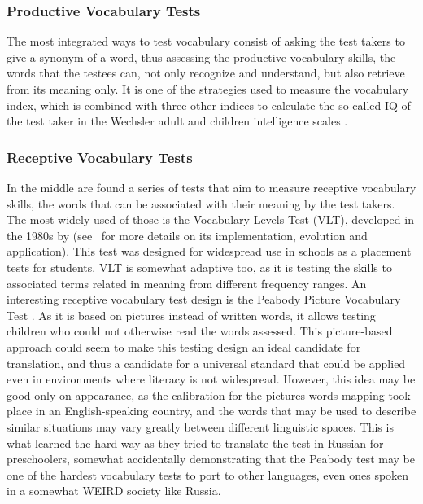         \subsubsection{Productive Vocabulary Tests}
The most integrated ways to test vocabulary consist of asking the test takers to give a synonym of a word, thus assessing the productive vocabulary skills, the words that the testees can, not only recognize and understand, but also retrieve from its meaning only. It is one of the strategies used to measure the vocabulary index, which is combined with three other indices to calculate the so-called IQ of the test taker in the Wechsler adult and children intelligence scales \parencite{wechsler_wechsler_nodate}.

        \subsubsection{Receptive Vocabulary Tests}
In the middle are found a series of tests that aim to measure receptive vocabulary skills, the words that can be associated with their meaning by the test takers. The most widely used of those is the Vocabulary Levels Test (VLT), developed in the 1980s by \textcite{nation_teaching_1990} (see~\cite{kremmel_vocabulary_2017} for more details on its implementation, evolution and application). This test was designed for widespread use in schools as a placement tests for students. VLT is somewhat adaptive too, as it is testing the skills to associated terms related in meaning from different frequency ranges. An interesting receptive vocabulary test design is the Peabody Picture Vocabulary Test \parencite{dunn_ppvt-4_nodate}. As it is based on pictures instead of written words, it allows testing children who could not otherwise read the words assessed. This picture-based approach could seem to make this testing design an ideal candidate for translation, and thus a candidate for a universal standard that could be applied even in environments where literacy is not widespread. However, this idea may be good only on appearance, as the calibration for the pictures-words mapping took place in an English-speaking country, and the words that may be used to describe similar situations may vary greatly between different linguistic spaces. This is what \textcite{kartushina_use_2022} learned the hard way as they tried to translate the test in Russian for preschoolers, somewhat accidentally demonstrating that the Peabody test may be one of the hardest vocabulary tests to port to other languages, even ones spoken in a somewhat WEIRD society like Russia.

